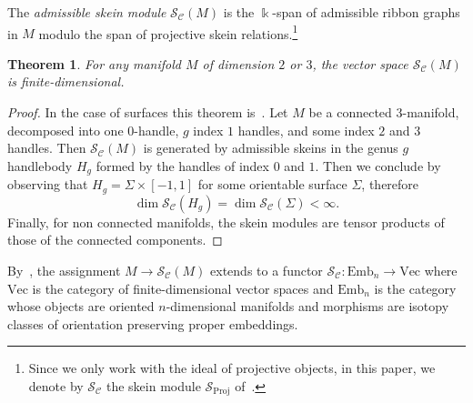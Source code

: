 \documentclass[10pt,a4paper]{amsart}
\newtheorem{theorem}{Theorem}
\numberwithin{equation}{section}
\newcommand{\Proj}{\operatorname{Proj}}
\numberwithin{theorem}{section}
\numberwithin{proposition}{section}
\numberwithin{definition}{section}
\numberwithin{lemma}{section}
\numberwithin{corollary}{section}
\numberwithin{remark}{section}
\numberwithin{example}{section}
\newcommand{\cat}{\mathcal{C}}
\newcommand{\FK}{{\Bbbk}}
\newcommand{\TSkein}{{\mathscr{S}}}
\newcommand{\Emb}{\mathrm{Emb}}
\newcommand{\Vect}{\mathrm{Vec}}
\begin{document}
\begin{definition}%
 The \emph{admissible skein module} $\TSkein_{\cat}(M)$ is
 the $\FK$-span of admissible ribbon graphs in $M$ modulo
 the span of projective skein relations.\footnote{Since we only work with the ideal of projective objects, in this paper, we denote by $\TSkein_\cat$ the skein module $\mathcal{S}_{\Proj}$ of~\cite{CGP22}.}
\end{definition}

\begin{theorem}
For any manifold $M$ of dimension $2$ or $3$, the vector space $\TSkein_\cat(M)$ is finite-dimensional.
\end{theorem}
\begin{proof}
In the case of surfaces this theorem is~\cite[Theorem~5.10]{CGP22}. Let $M$ be a connected 3-manifold, decomposed into one $0$-handle, $g$ index $1$ handles, and some index $2$ and $3$ handles.
Then $\TSkein_\cat(M)$ is generated by admissible skeins in the genus $g$ handlebody $H_g$ formed by the handles of index $0$ and $1$. Then we conclude by observing that $H_g=\Sigma\times [-1,1]$ for some orientable surface $\Sigma$, therefore
\[
\dim\TSkein_\cat(H_g)=\dim\TSkein_\cat(\Sigma)<\infty.
\]
Finally, for non connected manifolds, the skein modules are tensor products of those of the connected components.
\end{proof}

By~\cite[Proposition 2.2]{CGP22}, the assignment $M\to \TSkein_{\cat}(M)$ extends to a functor $\TSkein_{\cat}\colon \Emb_n \to \Vect$ where $\Vect$ is the category of finite-dimensional vector spaces and $\Emb_n$ is the category whose objects are oriented $n$-dimensional manifolds and morphisms are isotopy classes of orientation preserving proper embeddings.
\end{document}
